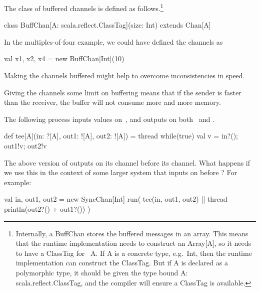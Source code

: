 \documentclass[notes,color]{sepslide0}
\begin{document}

\begin{slide}

The class of buffered channels is defined as follows.\footnote{Internally, a
  {\scalashape BuffChan} stores the buffered messages in an array.  This means
  that the runtime implementation needs to construct an {\scalashape
    Array[A]}, so it needs to have a {\scalashape ClassTag} for~{\scalashape
    A}.  If {\scalashape A} is a concrete type, e.g.~{\scalashape Int}, then
  the runtime implementation can construct the {\scalashape ClassTag}.  But if
  {\scalashape A} is declared as a polymorphic type, it should be given the
  type bound {\scalashape A: scala.reflect.ClassTag}, and the compiler will
  ensure a {\scalashape ClassTag} is available.}
%
\begin{scala}
class BuffChan[A: scala.reflect.ClassTag](size: Int) extends Chan[A]
\end{scala}


\vfill
\end{slide}


\begin{slide}

In the multiples-of-four example, we could have defined the channels as 
%
\begin{scala}
  val x1, x2, x4 = new BuffChan[Int](10)
\end{scala}

Making the channels buffered might help to overcome inconsistencies in speed. 

Giving the channels some limit on buffering means that if the sender is faster
than the receiver, the buffer will not consume more and more memory.  
\end{slide}



\begin{slide}

The following process inputs values on~, and outputs on
both~ and .
%
\begin{scala}
def tee[A](in: ?[A], out1: ![A], out2: ![A]) = thread{
  while(true){ val v = in?(); out1!v; out2!v }
}
\end{scala}

The above version of  outputs on its  channel before
its  channel.  What happens if we use this in the context of some
larger system that inputs on  before ?  For example:
\begin{scala}
val in, out1, out2 = new SyncChan[Int]
run( tee(in, out1, out2) || thread{ println(out2?() + out1?()) } )
\end{scala}
\end{slide}
\end{document}
